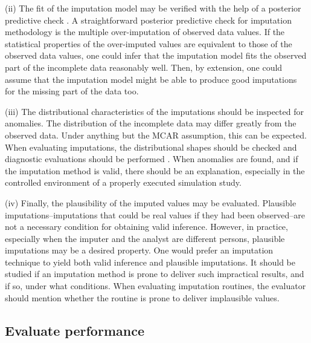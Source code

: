 \documentclass[bimj,fleqn]{w-art}
\begin{document}
(ii) The fit of the imputation model may be verified with the help of a posterior predictive check \citep[][]{nguy17, zhao22}. A straightforward posterior predictive check for imputation methodology is the multiple over-imputation of observed data values. If the statistical properties of the over-imputed values are equivalent to those of the observed data values, one could infer that the imputation model fits the observed part of the incomplete data reasonably well. Then, by extension, one could assume that the imputation model might be able to produce good imputations for the missing part of the data too.

(iii) The distributional characteristics of the imputations should be inspected for anomalies. The distribution of the incomplete data may differ greatly from the observed data. Under anything but the MCAR assumption, this can be expected. When evaluating imputations, the distributional shapes should be checked and diagnostic evaluations should be performed \citep[see][for a detailed overview of diagnostic evaluation for multivariate imputations]{abayomi2008diagnostics}. When anomalies are found, and if the imputation method is valid, there should be an explanation, especially in the controlled environment of a properly executed simulation study. 

(iv) Finally, the plausibility of the imputed values may be evaluated. Plausible imputations--imputations that could be real values if they had been observed--are not a necessary condition for obtaining valid inference. However, in practice, especially when the imputer and the analyst are different persons, plausible imputations may be a desired property. One would prefer an imputation technique to yield both valid inference and plausible imputations. It should be studied if an imputation method is prone to deliver such impractical results, and if so, under what conditions. When evaluating imputation routines, the evaluator should mention whether the routine is prone to deliver implausible values. 



\subsection{Evaluate performance}

\end{document}

